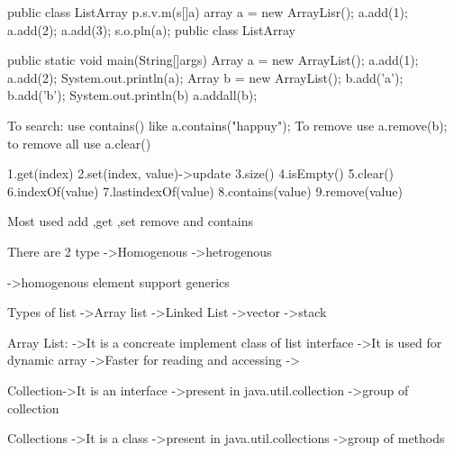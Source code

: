 {{{{{{{          public class ListArray{
                    p.s.v.m(s[]a){
                              array a = new ArrayLisr();
                              a.add(1);
                              a.add(2);
                              a.add(3);
                              s.o.pln(a);
                              }
                    }
          public class ListArray{
                    public static void main(String[]args){
                              Array a = new ArrayList();
                              a.add(1);
                              a.add(2);
                              System.out.println(a);
                              Array b = new ArrayList();
                              b.add('a');
                              b.add('b');
                              System.out.println(b)
                              a.addall(b);
                    }

          To search:
          use contains()
          like a.contains("happuy");
          To remove 
          use a.remove(b);
          to remove all
          use a.clear()

          1.get(index)
          2.set(index, value)->update
          3.size()
          4.isEmpty()
          5.clear()
          6.indexOf(value)
          7.lastindexOf(value)
          8.contains(value)
          9.remove(value)

          Most used add ,get ,set remove and contains

          There are 2 type 
                    ->Homogenous 
                    ->hetrogenous

          ->homogenous element support generics


Types of list
          ->Array list
          ->Linked List
          ->vector
          ->stack

          Array List:
             ->It is a concreate implement class of list interface
             ->It is used for dynamic array
             ->Faster for reading and accessing
             ->

          Collection->It is an interface
                     ->present in java.util.collection
                     ->group of collection

           Collections
                     ->It is a class 
                     ->present in java.util.collections
                     ->group of methods

                     

}}}}}}}}
